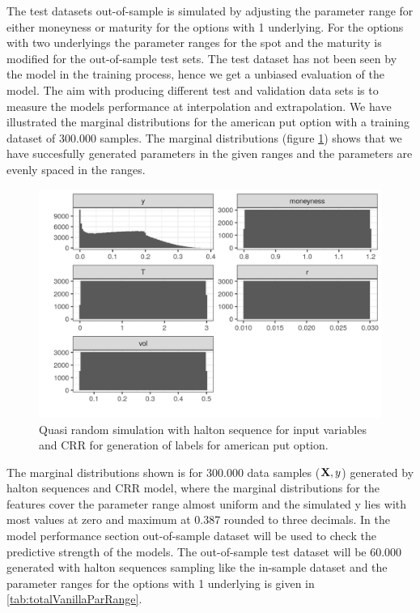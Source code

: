 The test datasets out-of-sample is simulated by adjusting the parameter range for either moneyness or maturity for the options with 1 underlying. For the options with two underlyings the parameter ranges for the spot and the maturity is modified for the out-of-sample test sets. The test dataset has not been seen by the model in the training process, hence we get a unbiased evaluation of the model. The aim with producing different test and validation data sets is to measure the models performance at interpolation and extrapolation. We have illustrated the marginal distributions for the american put option with a training dataset of 300.000 samples. The marginal distributions (figure \ref{fig:marginalAmerPut}) shows that we have succesfully generated parameters in the given ranges and the parameters are evenly spaced in the ranges. 
 
\begin{figure}[H]
\centering
\includegraphics{Figures/marginalAmerPut.png}
\decoRule
\caption[Marginal Distributions For American Put]{Quasi random simulation with halton sequence for input variables and CRR for generation of labels for american put option.}
\label{fig:marginalAmerPut}
\end{figure}
The marginal distributions shown is for $300.000$ data samples ($\mathbf{X},y$) generated by halton sequences and CRR model, where the marginal distributions for the features cover the parameter range almost uniform and the simulated y lies with most values at zero and maximum at 0.387 rounded to three decimals. In the model performance section out-of-sample dataset will be used to check the predictive strength of the models. The out-of-sample test dataset will be 60.000 generated with halton sequences sampling like the in-sample dataset and the parameter ranges for the options with 1 underlying is given in \ref{tab:totalVanillaParRange}.

